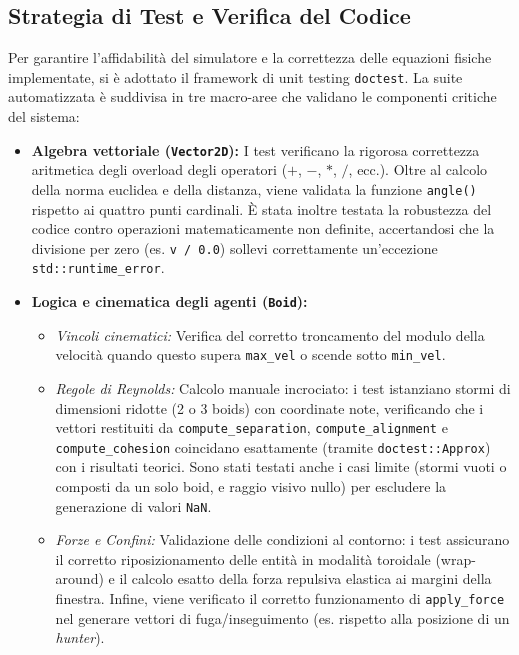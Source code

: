 \documentclass[11pt, a4paper]{article}
\begin{document}
\subsection{Strategia di Test e Verifica del Codice}
Per garantire l'affidabilità del simulatore e la correttezza delle equazioni fisiche implementate, si è adottato il framework di unit testing \texttt{doctest}. La suite automatizzata è suddivisa in tre macro-aree che validano le componenti critiche del sistema:

\begin{itemize}
    \item \textbf{Algebra vettoriale (\texttt{Vector2D}):} 
    I test verificano la rigorosa correttezza aritmetica degli overload degli operatori ($+$, $-$, $*$, $/$, ecc.). Oltre al calcolo della norma euclidea e della distanza, viene validata la funzione \texttt{angle()} rispetto ai quattro punti cardinali. È stata inoltre testata la robustezza del codice contro operazioni matematicamente non definite, accertandosi che la divisione per zero (es. \texttt{v / 0.0}) sollevi correttamente un'eccezione \texttt{std::runtime\_error}.

    \item \textbf{Logica e cinematica degli agenti (\texttt{Boid}):}
    \begin{itemize}
        \item \textit{Vincoli cinematici:} Verifica del corretto troncamento del modulo della velocità quando questo supera \texttt{max\_vel} o scende sotto \texttt{min\_vel}.
        \item \textit{Regole di Reynolds:} Calcolo manuale incrociato: i test istanziano stormi di dimensioni ridotte (2 o 3 boids) con coordinate note, verificando che i vettori restituiti da \texttt{compute\_separation}, \texttt{compute\_alignment} e \texttt{compute\_cohesion} coincidano esattamente (tramite \texttt{doctest::Approx}) con i risultati teorici. Sono stati testati anche i casi limite (stormi vuoti o composti da un solo boid, e raggio visivo nullo) per escludere la generazione di valori \texttt{NaN}.
        \item \textit{Forze e Confini:} Validazione delle condizioni al contorno: i test assicurano il corretto riposizionamento delle entità in modalità toroidale (wrap-around) e il calcolo esatto della forza repulsiva elastica ai margini della finestra. Infine, viene verificato il corretto funzionamento di \texttt{apply\_force} nel generare vettori di fuga/inseguimento (es. rispetto alla posizione di un \textit{hunter}).
    \end{itemize}


\end{itemize}
\end{document}
